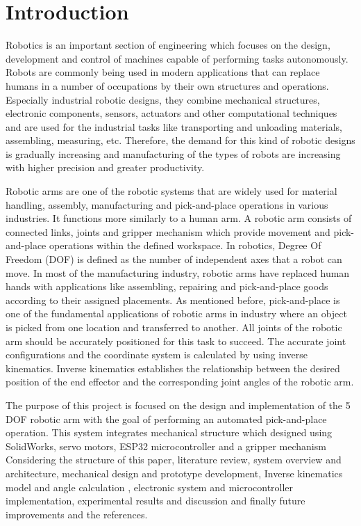\section{Introduction}

Robotics is an important section of engineering which focuses on the design, development and control of machines capable of performing tasks autonomously. Robots are commonly being used in modern applications that can replace humans in a number of occupations by their own structures and operations. Especially industrial robotic designs, they combine mechanical structures, electronic components, sensors, actuators and other computational techniques and are used for the industrial tasks like transporting and unloading materials, assembling, measuring, etc. Therefore, the demand for this kind of robotic designs is gradually increasing and manufacturing of the types of robots are increasing with higher precision and greater productivity. 

Robotic arms are one of the robotic systems that are widely used for material handling, assembly, manufacturing and pick-and-place operations in various industries. It functions more similarly to a human arm. A robotic arm consists of connected links, joints and gripper mechanism which provide movement and pick-and-place operations within the defined workspace.  In robotics, Degree Of Freedom (DOF) is defined as the number of independent axes that a robot can move. In most of the manufacturing industry, robotic arms have replaced human hands with applications like assembling, repairing and pick-and-place goods according to their assigned placements. 
As mentioned before, pick-and-place is one of the fundamental applications of robotic arms in industry where an object is picked from one location and transferred to another. All joints of the robotic arm should be accurately positioned for this task to succeed. The accurate joint configurations and the coordinate system is calculated by using inverse kinematics. Inverse kinematics establishes the relationship between the desired position of the end effector and the corresponding joint angles of the robotic arm. 

The purpose of this project is focused on the design and implementation of the 5 DOF robotic arm with the goal of performing an automated pick-and-place operation. This system integrates mechanical structure which designed using SolidWorks, servo motors, ESP32 microcontroller and a gripper mechanism Considering the structure of this paper, literature review, system overview and architecture, mechanical design and prototype development, Inverse kinematics model and angle calculation , electronic system and microcontroller implementation, experimental results and discussion and finally future improvements and the references. 

